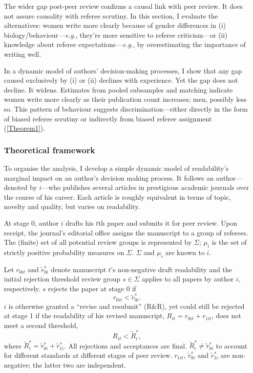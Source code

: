 The wider gap post-peer review confirms a causal link with peer review. It does not assure causality with referee scrutiny. In this section, I evaluate the alternatives: women write more clearly because of gender differences in (i) biology\slash behaviour---\emph{e.g.}, they're more sensitive to referee criticism---or (ii) knowledge about referee expectations---\emph{e.g.}, by overestimating the importance of writing well.

In a dynamic model of authors' decision-making processes, I show that any gap caused exclusively by (i) or (ii) declines with experience. Yet the gap does not decline. It widens. Estimates from pooled subsamples and matching indicate women write more clearly as their publication count increases; men, possibly less so. This pattern of behaviour suggests discrimination---either directly in the form of biased referee scrutiny or indirectly from biased referee assignment (\autoref{Theorem1}).

\subsubsection{Theoretical framework}
\label{seumodel}

To organise the analysis, I develop a simple dynamic model of readability's marginal impact on an author's decision making process. It follows an author---denoted by $i$---who publishes several articles in prestigious academic journals over the course of his career. Each article is roughly equivalent in terms of topic, novelty and quality, but varies on readability.

At stage 0, author $i$ drafts his $t$th paper and submits it for peer review. Upon receipt, the journal's editorial office assigns the manuscript to a group of referees. The (finite) set of all potential review groups is represented by $\Sigma$; $\mu_i$ is the set of strictly positive probability measures on $\Sigma$. $\Sigma$ and $\mu_i$ are known to $i$.

Let $r_{0it}$ and $\widetilde r_{0i}^s$ denote manuscript $t$'s non-negative draft readability and the initial rejection threshold review group $s\in\Sigma$ applies to all papers by author $i$, respectively. $s$ rejects the paper at stage 0 if $$r_{0it}<\widetilde r_{0i}^s.$$ $i$ is otherwise granted a ``revise and resubmit'' (R\&R), yet could still be rejected at stage 1 if the readability of his revised manuscript, $R_{it}=r_{0it}+r_{1it}$, does not meet a second threshold, $$R_{it}<\widetilde R_i^s,$$ where $\widetilde R_i^s=\widetilde r_{0i}^s+\widetilde r_{1i}^s$. All rejections and acceptances are final. $\widetilde R_i^s\ne\widetilde r_{0i}^s$ to account for different standards at different stages of peer review. $r_{1it}$, $\widetilde r_{0i}^s$ and $\widetilde r_{1i}^s$ are non-negative; the latter two are independent.

